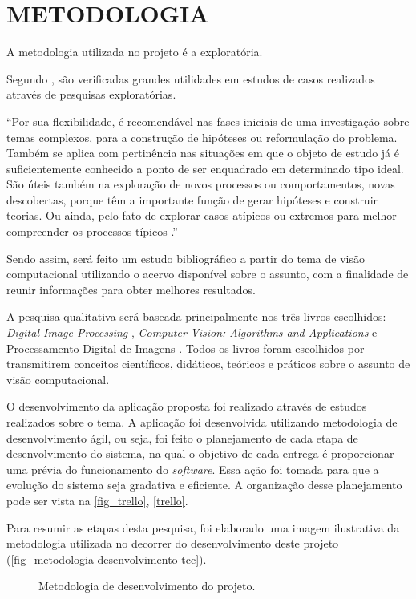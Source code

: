 \chapter{\textbf{METODOLOGIA}}
\label{metodologia}

A metodologia utilizada no projeto é a exploratória.

Segundo , são verificadas grandes utilidades em estudos de casos realizados através de pesquisas exploratórias.

\begin{citacao}
“Por sua flexibilidade, é recomendável nas fases iniciais de uma investigação sobre temas complexos, para a construção de hipóteses ou reformulação do problema. Também se aplica com pertinência nas situações em que o objeto de estudo já é suficientemente conhecido a ponto de ser enquadrado em determinado tipo ideal. São úteis também na exploração de novos processos ou comportamentos, novas descobertas, porque têm a importante função de gerar hipóteses e construir teorias. Ou ainda, pelo fato de explorar casos atípicos ou extremos para melhor compreender os processos típicos \cite{VENTURA2007}.”
\end{citacao}

Sendo assim, será feito um estudo bibliográfico a partir do tema de visão computacional utilizando o acervo disponível sobre o assunto, com a finalidade de reunir informações para obter melhores resultados.

A pesquisa qualitativa será baseada principalmente nos três livros escolhidos: \textit{Digital Image Processing} \cite{GONZALEZ2002},  \textit{Computer Vision: Algorithms and Applications} \cite{SZELISKI2010} e Processamento Digital de Imagens \cite{FILHO1999}. Todos os livros foram escolhidos por transmitirem conceitos científicos, didáticos, teóricos e práticos sobre o assunto de visão computacional.

O desenvolvimento da aplicação proposta foi realizado através de estudos realizados sobre o tema. A aplicação foi desenvolvida utilizando metodologia de desenvolvimento ágil, ou seja, foi feito o planejamento de cada etapa de desenvolvimento do sistema, na qual o objetivo de cada entrega é proporcionar uma prévia do funcionamento do \textit{software}. Essa ação foi tomada para que a evolução do sistema seja gradativa e eficiente. A organização desse planejamento pode ser vista na \autoref{fig_trello}, \autoref{trello}.

Para resumir as etapas desta pesquisa, foi elaborado uma imagem ilustrativa da metodologia utilizada no decorrer do desenvolvimento deste projeto (\autoref{fig_metodologia-desenvolvimento-tcc}).

\begin{figure}[ht]
	\caption{\label{fig_metodologia-desenvolvimento-tcc}Metodologia de desenvolvimento do projeto.}
	\begin{center}
	\end{center}
	\centering {}
\end{figure}